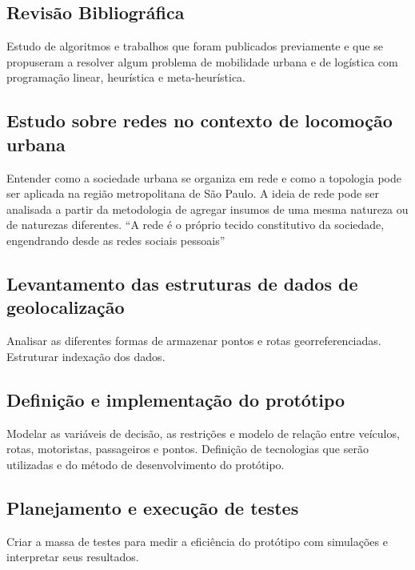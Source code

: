 \subsection{Revisão Bibliográfica} 
Estudo de algoritmos e trabalhos que foram publicados previamente e que se propuseram a resolver algum problema de mobilidade urbana e de logística com programação linear, heurística e meta-heurística. 

\subsection{Estudo sobre redes no contexto de locomoção urbana}
Entender como a sociedade urbana se organiza em rede e como a topologia pode ser aplicada na região metropolitana de São Paulo.  A ideia de rede pode ser analisada a partir da metodologia de agregar insumos de uma mesma natureza ou de naturezas diferentes. ``A rede é o próprio tecido constitutivo da sociedade, engendrando desde as redes sociais pessoais'' \cite{inojosa}

\subsection{Levantamento das estruturas de dados de geolocalização}
Analisar as diferentes formas de armazenar pontos e rotas georreferenciadas. Estruturar indexação dos dados.


\subsection{Definição e implementação do protótipo}
Modelar as variáveis de decisão, as restrições e modelo de relação entre veículos, rotas, motoristas, passageiros e pontos. Definição de tecnologias que serão utilizadas e do método de desenvolvimento do protótipo.

\subsection{Planejamento e execução de testes}
Criar a massa de testes para medir a eficiência do protótipo com simulações e interpretar seus resultados.

